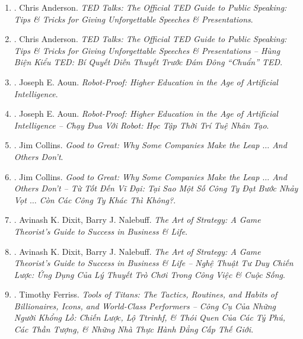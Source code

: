 \documentclass{article}
\begin{document}
\begin{enumerate}
	\item \cite{Anderson_TED}. {\sc Chris Anderson}. {\it TED Talks: The Official TED Guide to Public Speaking: Tips \& Tricks for Giving Unforgettable Speeches \& Presentations}.\hfill{\sf[reading]}

	\item \cite{Anderson_TED_VN}. {\sc Chris Anderson}. {\it TED Talks: The Official TED Guide to Public Speaking: Tips \& Tricks for Giving Unforgettable Speeches \& Presentations -- Hùng Biện Kiểu TED: Bí Quyết Diễn Thuyết Trước Đám Đông ``Chuẩn'' TED}.\hfill{\sf[done]}

	\item \cite{Aoun_robot-proof}. {\sc Joseph E. Aoun}. {\it Robot-Proof: Higher Education in the Age of Artificial Intelligence}.

	\item \cite{Aoun_robot-proof_VN}. {\sc Joseph E. Aoun}. {\it Robot-Proof: Higher Education in the Age of Artificial Intelligence -- Chạy Đua Với Robot: Học Tập Thời Trí Tuệ Nhân Tạo}.\hfill{\sf[done]}

	\item \cite{Collins_good2great}. {\sc Jim Collins}. {\it Good to Great: Why Some Companies Make the Leap $\ldots$ And Others Don't}.

	\item \cite{Collins_good2great_VN}. {\sc Jim Collins}. {\it Good to Great: Why Some Companies Make the Leap $\ldots$ And Others Don't -- Từ Tốt Đến Vĩ Đại: Tại Sao Một Số Công Ty Đạt Bước Nhảy Vọt $\ldots$ Còn Các Công Ty Khác Thì Không?}.\hfill{\sf[done]}

	\item \cite{Dixit_Nalebuff2010}. {\sc Avinash K. Dixit, Barry J. Nalebuff}. {\it The Art of Strategy: A Game Theorist's Guide to Success in Business \& Life}.

	\item \cite{Dixit_Nalebuff_strategy}. {\sc Avinash K. Dixit, Barry J. Nalebuff}. {\it The Art of Strategy: A Game Theorist's Guide to Success in Business \& Life -- Nghệ Thuật Tư Duy Chiến Lược: Ứng Dụng Của Lý Thuyết Trò Chơi Trong Công Việc \& Cuộc Sống}.\hfill{\sf[done]}

    \item \cite{Ferriss_titan_VN}. {\sc Timothy Ferriss}. {\it Tools of Titans: The Tactics, Routines, and Habits of Billionaires, Icons, and World-Class Performers -- Công Cụ Của Những Người Khổng Lồ: Chiến Lược, Lộ Ttrinhf, \& Thói Quen Của Các Tỷ Phú, Các Thần Tượng, \& Những Nhà Thực Hành Đẳng Cấp Thế Giới}.\hfill{\sf[done]}


\end{enumerate}
\end{document}
